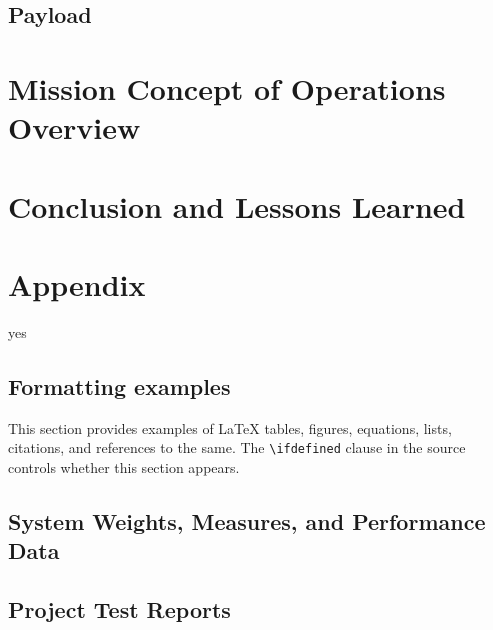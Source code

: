 \documentclass[conf]{new-aiaa}
\def\WIP{yes}
\begin{document}
\subsection{Payload}

\section{Mission Concept of Operations Overview}

\begin{quotation}
\CONOPSDescription
\end{quotation}

\section{Conclusion and Lessons Learned}

\begin{quotation}
\ConclusionDescription
\end{quotation}

\pagebreak
\section*{Appendix}

\ifdefined\WIP
\subsection*{Formatting examples}
	This section provides examples of \LaTeX{} tables, figures, equations,
	lists, citations, and references to the same. The \verb|\ifdefined| clause
	in the source controls whether this section appears.
\fi

\subsection{System Weights, Measures, and Performance Data}

\begin{quotation}
\SystemMeasuresDescription{}
\end{quotation}

\subsection{Project Test Reports}

\begin{quotation}
\TestReportsDescription{}
\end{quotation}
\end{document}

